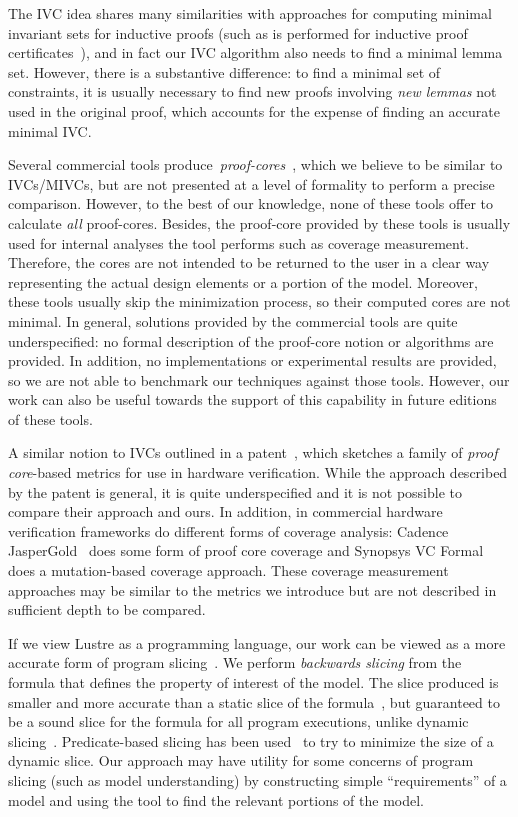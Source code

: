 The IVC idea shares many similarities with approaches for computing minimal invariant sets for inductive proofs (such as is performed for inductive proof certificates~\cite{piskac2016, Ivrii14:invariants}), and in fact our IVC algorithm also needs to find a minimal lemma set.  However, there is a substantive difference: to find a minimal set of constraints, it is usually necessary to find new proofs involving {\em new lemmas} not used in the original proof, which accounts for the expense of finding an accurate minimal IVC.

Several commercial tools produce~\emph{proof-cores}~\cite{hanna2015formal, jasper_gold}, which we believe to be similar to IVCs/MIVCs, but are not presented at a level of formality to perform a precise comparison.  However, to the best of our knowledge, none of these tools offer to calculate \emph{all} proof-cores. Besides, the proof-core provided by these tools is usually used for internal analyses the tool performs such as coverage measurement. Therefore, the cores are not intended to be returned to the user in a clear way representing the actual design elements or a portion of the model. Moreover, these tools usually skip the minimization process, so their computed cores are not minimal. 
In general, solutions provided by the commercial tools are quite underspecified:
no formal description of the proof-core notion or algorithms are provided. In addition, no implementations or experimental results are provided, so we are not able to benchmark our techniques against those tools. However, our work can also be useful towards the support of this capability in future editions of these tools.

A similar notion to IVCs outlined in a patent~\cite{hanna2015formal}, which sketches a family of {\em proof core}-based metrics for use in hardware verification.  While the approach described by the patent is general, it is quite underspecified and it is not possible to compare their approach and ours. In addition, in commercial hardware verification frameworks do different forms of coverage analysis: Cadence JasperGold~\cite{jasper_gold} does some form of proof core coverage and Synopsys VC Formal~\cite{Synopsys_VC_formal} does a mutation-based coverage approach.  These coverage measurement approaches may be similar to the metrics we introduce but are not described in sufficient depth to be compared.

If we view Lustre as a programming language, our work can be viewed as a more accurate form of program slicing~\cite{Tip95asurvey}.  We perform {\em backwards slicing} from the formula that defines the property of interest of the model.  The slice produced is smaller and more accurate than a static slice of the formula~\cite{Weiser:1981:slicing}, but guaranteed to be a sound slice for the formula for all program executions, unlike dynamic slicing~\cite{Agrawal:1990:slicing}.  Predicate-based slicing has been used~\cite{Li04:slicing} to try to minimize the size of a dynamic slice.  Our approach may have utility for some concerns of program slicing (such as model understanding) by constructing simple ``requirements'' of a model and using the tool to find the relevant portions of the model.

